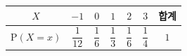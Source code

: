 {\setlength{\tabcolsep}{7pt}\renewcommand{\arraystretch}{2.2}%
\begin{tabular}{|c|c|c|c|c|c|c|}
\hline
$X$ & $-1$ & $0$ & $1$ & $2$ & $3$ & 합계 \\
\hline
$\mathrm{P}(X=x)$ & $\dfrac{1}{12}$ & $\dfrac{1}{6}$ & $\dfrac{1}{3}$ & $\dfrac{1}{6}$ & $\dfrac{1}{4}$ & $1$ \\
\hline
\end{tabular}}
